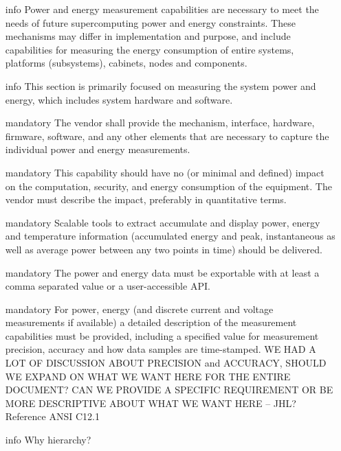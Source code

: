 \begin{itemize}
\item[{info}]
Power and energy measurement capabilities are necessary to meet the needs of future supercomputing power and energy constraints. These mechanisms may differ in implementation and purpose, and include capabilities for measuring the energy consumption of entire systems, platforms (subsystems), cabinets, nodes and components.  

\item[{info}]
This section is primarily focused on measuring the system power and energy, which includes system hardware and software.  

\item[{mandatory}]
The vendor shall provide the mechanism, interface, hardware, firmware, software, and any other elements that are necessary to capture the individual power and energy measurements. 

\item[{mandatory}]
This capability should have no (or minimal and defined) impact on the computation, security, and energy consumption of the equipment.  The vendor must describe the impact, preferably in quantitative terms.  

\item[{mandatory}]
Scalable tools to extract accumulate and display power, energy and temperature information (accumulated energy and peak, instantaneous as well as average power between any two points in time) should be delivered.

\item[{mandatory}]
The power and energy data must be exportable with at least a comma separated value or a user-accessible API. 

\item[{mandatory}]
For power, energy (and discrete current and voltage measurements if available) a detailed description of the measurement capabilities must be provided, including a specified value for measurement precision, accuracy and how data samples are time-stamped. WE HAD A LOT OF DISCUSSION ABOUT PRECISION and ACCURACY, SHOULD WE EXPAND ON WHAT WE WANT HERE FOR THE ENTIRE DOCUMENT? CAN WE PROVIDE A SPECIFIC REQUIREMENT OR BE MORE DESCRIPTIVE ABOUT WHAT WE WANT HERE – JHL? Reference ANSI C12.1

\item[{info}]
Why hierarchy?


\end{itemize}
